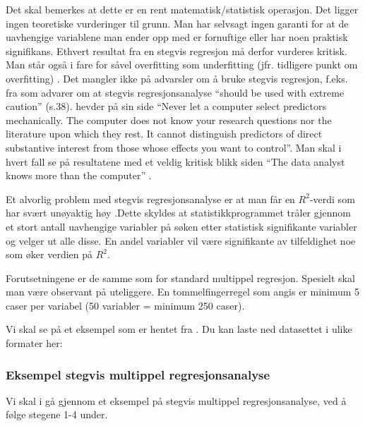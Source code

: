 \documentclass[
]{article}
\begin{document}
Det skal bemerkes at dette er en rent matematisk/statistisk operasjon. Det ligger ingen teoretiske vurderinger til grunn. Man har selvsagt ingen garanti for at de uavhengige variablene man ender opp med er fornuftige eller har noen praktisk signifikans. Ethvert resultat fra en stegvis regresjon må derfor vurderes kritisk. Man står også i fare for såvel overfitting som underfitting (jfr. tidligere punkt om overfitting) \citep{fieldDiscoveringStatisticsUsing2009}. Det mangler ikke på advarsler om å bruke stegvis regresjon, f.eks. fra \citet{milesApplyingRegressionCorrelation2001} som advarer om at stegvis regresjonsanalyse ``should be used with extreme caution'' (s.38). \citet{singerAppliedLongitudinalData2003} hevder på sin side ``Never let a computer select predictors mechanically. The computer does not know your research questions nor the literature upon which they rest. It cannot distinguish predictors of direct substantive interest from those whose effects you want to control''. Man skal i hvert fall se på resultatene med et veldig kritisk blikk siden ``The data analyst knows more than the computer'' \citep[s.391]{hendersonBuildingMultipleRegression1981}.

Et alvorlig problem med stegvis regresjonsanalyse er at man får en \(R^2\)-verdi som har svært unøyaktig høy \citep{milesApplyingRegressionCorrelation2001}.Dette skyldes at statistikkprogrammet tråler gjennom et stort antall uavhengige variabler på søken etter statistisk signifikante variabler og velger ut alle disse. En andel variabler vil være signifikante av tilfeldighet noe som øker verdien på \(R^2\).

Forutsetningene er de samme som for standard multippel regresjon. Spesielt skal man være observant på uteliggere. En tommelfingerregel som angis er minimum 5 caser per variabel (50 variabler = minimum 250 caser).

Vi skal se på et eksempel som er hentet fra \href{https://www.spss-tutorials.com/stepwise-regression-in-spss-example/}{} \citep{vandenbergStepwiseRegressionSPSS2018}.
Du kan laste ned datasettet i ulike formater her:

\hypertarget{eksempel-stegvis-multippel-regresjonsanalyse}{%
\subsubsection{Eksempel stegvis multippel regresjonsanalyse}\label{eksempel-stegvis-multippel-regresjonsanalyse}}

Vi skal i gå gjennom et eksempel på stegvis multippel regresjonsanalyse, ved å følge stegene 1-4 under.
\end{document}
